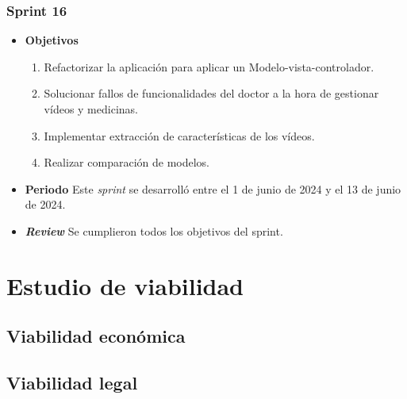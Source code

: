 \subsubsection{Sprint 16}
\begin{itemize}
\item \textbf{Objetivos}
\begin{enumerate}
\item Refactorizar la aplicación para aplicar un Modelo-vista-controlador.
\item Solucionar fallos de funcionalidades del doctor a la hora de gestionar vídeos y medicinas.
\item Implementar extracción de características de los vídeos.
\item Realizar comparación de modelos.
\end{enumerate}
\item \textbf{Periodo}
Este \textsl{sprint} se desarrolló entre el 1 de junio de 2024 y el 13 de junio de 2024.
\item \textbf{\textsl{Review}}
Se cumplieron todos los objetivos del sprint.
\end{itemize}
\section{Estudio de viabilidad}

\subsection{Viabilidad económica}

\subsection{Viabilidad legal}


